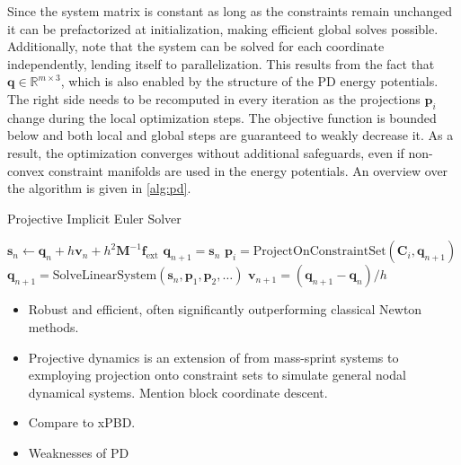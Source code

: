 Since the system matrix is constant as long as the constraints remain unchanged it can be prefactorized at initialization, making efficient
global solves possible. Additionally, note that the system can be solved for each coordinate independently, lending itself to parallelization. 
This results from the fact that $\bm{q} \in \mathbb{R}^{m \times 3}$, which is also enabled by the structure of the PD energy potentials. 
The right side needs to be recomputed in every iteration as the projections $\bm{p}_i$ change during the local optimization steps. The 
objective function is bounded below and both local and global steps are guaranteed to weakly decrease it. As a result, the optimization 
converges without additional safeguards, even if non-convex constraint manifolds are used in the energy potentials. An overview over the 
algorithm is given in \cref{alg:pd}.

\begin{algorithm}
\caption{Projective Implicit Euler Solver}\label{alg:pd}
\begin{algorithmic}
\State $\bm{s}_n \gets \bm{q}_n + h\bm{v}_n + h^2\bm{M}^{-1}\bm{f}_{\text{ext}}$
\State $\bm{q}_{n+1} = \bm{s}_n$
\State $\bm{p}_i = \text{ProjectOnConstraintSet}(\bm{C}_i, \bm{q}_{n+1}) $
\EndFor
\State $\bm{q}_{n+1} = \text{SolveLinearSystem}(\bm{s}_n, \bm{p}_1, \bm{p}_2, \ldots) $
\EndFor
\State $\bm{v}_{n+1} = (\bm{q}_{n+1} - \bm{q}_n) / h$
\end{algorithmic}
\end{algorithm}

\begin{itemize}
    \item Robust and efficient, often significantly outperforming classical Newton methods.
    \item Projective dynamics is an extension of \cite{liu2013} from mass-sprint systems to exmploying projection onto constraint sets to 
        simulate general nodal dynamical systems. Mention block coordinate descent.
    \item Compare to xPBD.
    \item Weaknesses of PD
\end{itemize}
